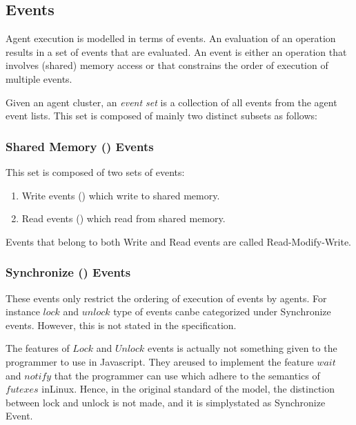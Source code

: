 \subsection{Events}
        
    Agent execution is modelled in terms of events. An evaluation of an operation results in a set of events that are evaluated. An event is either an operation that involves (shared) memory access or that constrains the order of execution of multiple events.

    Given an agent cluster, an \textit{event set}  is a collection of all events from the agent event lists. This set is composed of mainly two distinct subsets as follows: 

    \subsubsection{Shared Memory () Events} 
        
        This set is composed of two sets of events: 
        \begin{enumerate}
            \item Write events () which write to shared memory.
            \item Read events () which read from shared memory. 
        \end{enumerate}
        Events that belong to both Write and Read events are called Read-Modify-Write. 
    
    \subsubsection{Synchronize () Events} 
        
        These events only restrict the ordering of execution of events by agents. For instance $lock$ and $unlock$ type of events canbe categorized under Synchronize events. However, this is not stated in the specification. 
    
        The features of $Lock$ and $Unlock$ events is actually not something given to the programmer to use in Javascript. They areused to implement the feature $wait$ and  $notify$ that the programmer can use which adhere to the semantics of $futexes$ inLinux. Hence, in the original standard of the model, the distinction between lock and unlock is not made, and it is simplystated as Synchronize Event.
 
